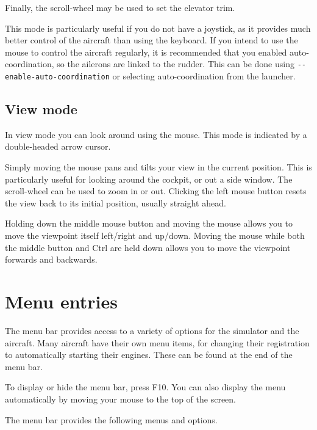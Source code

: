 Finally, the scroll-wheel may be used to set the elevator trim.

This mode is particularly useful if you do not have a joystick, as it provides much better
control of the aircraft than using the keyboard. If you intend to use the mouse to control
the aircraft regularly, it is recommended that you enabled auto-coordination, so the
ailerons are linked to the rudder. This can be done using \texttt{-$ $-enable-auto-coordination}
or selecting auto-coordination from the launcher.

\subsection{View mode}

In view mode you can look around using the mouse. This mode is indicated by a double-headed
arrow cursor.

Simply moving the mouse pans and tilts your view in the current position. This is
particularly useful for looking around the cockpit, or out a side window. The
scroll-wheel can be used to zoom in or out. Clicking the left mouse button
resets the view back to its initial position, usually straight ahead.

Holding down the middle mouse button and moving the mouse allows you to move the viewpoint
itself left/right and up/down. Moving the mouse while both the middle button and Ctrl are
held down allows you to move the viewpoint forwards and backwards.

\section{Menu entries}

The menu bar provides access to a variety of options for the simulator and the aircraft.
Many aircraft have their own menu items, for changing their registration to automatically
starting their engines. These can be found at the end of the menu bar.

To display or hide the menu bar, press F10. You can also display the menu automatically
by moving your mouse to the top of the screen.

The menu bar provides the following menus and options.

